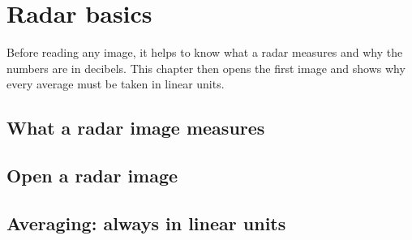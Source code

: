 \chapter{Radar basics}\label{ch:basics}
Before reading any image, it helps to know what a radar measures and why the numbers are in decibels. This chapter then opens the first image and shows why every average must be taken in linear units.

\section{What a radar image measures}

\section{Open a radar image}

\section{Averaging: always in linear units}

